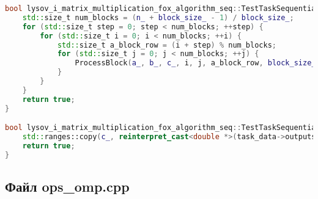 \documentclass[12pt,a4paper]{extarticle}
\begin{document}
\begin{lstlisting}[language=C++]
bool lysov_i_matrix_multiplication_fox_algorithm_seq::TestTaskSequential::RunImpl() {
	std::size_t num_blocks = (n_ + block_size_ - 1) / block_size_;
	for (std::size_t step = 0; step < num_blocks; ++step) {
		for (std::size_t i = 0; i < num_blocks; ++i) {
			std::size_t a_block_row = (i + step) % num_blocks;
			for (std::size_t j = 0; j < num_blocks; ++j) {
				ProcessBlock(a_, b_, c_, i, j, a_block_row, block_size_, n_);
			}
		}
	}
	return true;
}

bool lysov_i_matrix_multiplication_fox_algorithm_seq::TestTaskSequential::PostProcessingImpl() {
	std::ranges::copy(c_, reinterpret_cast<double *>(task_data->outputs[0]));
	return true;
}

\end{lstlisting}

\clearpage
{}
\subsection*{Файл ops\_omp.cpp}
\end{document}
